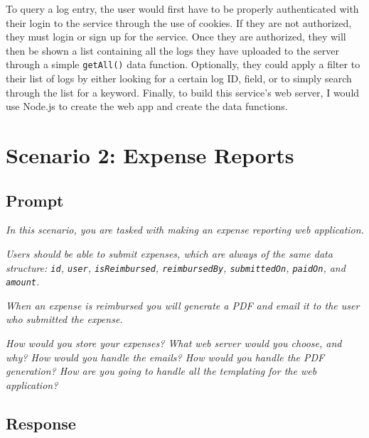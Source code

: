 \documentclass[11pt]{article}
\begin{document}
	To query a log entry, the user would first have to be properly authenticated with their login to the service through the use of cookies. If they are not authorized, they must login or sign up for the service. Once they are authorized, they will then be shown a list containing all the logs they have uploaded to the server through a simple \texttt{getAll()} data function. Optionally, they could apply a filter to their list of logs by either looking for a certain log ID, field, or to simply search through the list for a keyword. Finally, to build this service's web server, I would use Node.js to create the web app and create the data functions.

	\section*{Scenario 2: Expense Reports}
	\subsection*{Prompt}
	\textit{In this scenario, you are tasked with making an expense reporting web application.}

	\textit{Users should be able to submit expenses, which are always of the same data structure: \texttt{id}, \texttt{user}, \texttt{isReimbursed}, \texttt{reimbursedBy}, \texttt{submittedOn}, \texttt{paidOn}, and \texttt{amount}.}

	\textit{When an expense is reimbursed you will generate a PDF and email it to the user who submitted the expense.}

	\textit{How would you store your expenses? What web server would you choose, and why? How would you handle the emails? How would you handle the PDF generation? How are you going to handle all the templating for the web application?}

	\subsection*{Response}
\end{document}
